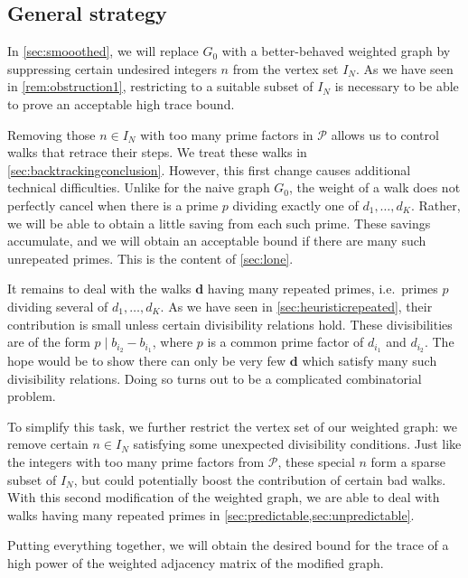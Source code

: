\documentclass[11pt]{amsart}
\theoremstyle{definition}
\newcommand{\N}{I_N}
\newcommand{\primes}{\mathcal{P}}
\renewcommand{\d}{\boldsymbol{d}}
\newcommand{\graph}{G}
\newcommand{\sommespart}{b}
\newcommand{\repK}{K}
\begin{document}
\subsection{General strategy}
\label{sec:generalstrategy}
In \cref{sec:smooothed}, we will replace $\graph_0$ with a better-behaved weighted graph by suppressing certain undesired integers $n$ from the vertex set $\N$. As we have seen in \cref{rem:obstruction1}, restricting to a suitable subset of $\N$ is necessary to be able to prove an acceptable high trace bound. 

Removing those $n\in \N$ with too many prime factors in $\primes$ allows us to control walks that retrace their steps. We treat these walks in \cref{sec:backtrackingconclusion}. However, this first change causes additional technical difficulties. Unlike for the naive graph $\graph_0$, the weight of a walk does not perfectly cancel when there is a prime $p$ dividing exactly one of $d_1, \ldots, d_{\repK}$. Rather, we will be able to obtain a little saving from each such prime. These savings accumulate, and we will obtain an acceptable bound if there are many such unrepeated primes. This is the content of \cref{sec:lone}. 

It remains to deal with the walks $\d$ having many repeated primes, i.e.~primes $p$ dividing several of $d_1, \ldots, d_{\repK}$. As we have seen in \cref{sec:heuristicrepeated}, their contribution is small unless certain divisibility relations hold. These divisibilities are of the form $p\mid \sommespart_{i_2} - \sommespart_{i_1}$, where $p$ is a common prime factor of $d_{i_1}$ and $d_{i_2}$. The hope would be to show there can only be very few $\d$ which satisfy many such divisibility relations. Doing so turns out to be a complicated combinatorial problem. 

To simplify this task, we further restrict the vertex set of our weighted graph: we remove certain $n\in \N$ satisfying some unexpected divisibility conditions. Just like the integers with too many prime factors from $\primes$, these special $n$ form a sparse subset of $\N$, but could potentially boost the contribution of certain bad walks. With this second modification of the weighted graph, we are able to deal with walks having many repeated primes in \cref{sec:predictable,sec:unpredictable}.

Putting everything together, we will obtain the desired bound for the trace of a high power of the weighted adjacency matrix of the modified graph.
\end{document}
